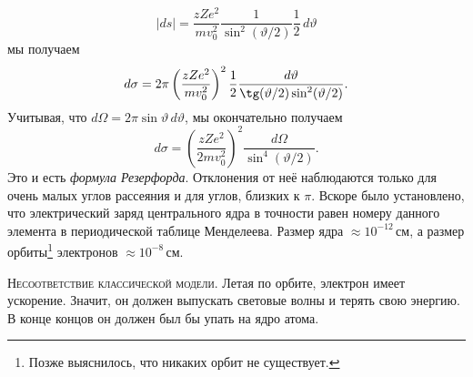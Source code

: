 \[
    |ds| = \frac{zZe^2}{mv_0^2}
    \frac{1}{\sin^2(\vartheta/2)}\frac{1}{2}\,d\vartheta
\]
мы получаем 
\[
    d\sigma = 2\pi \left( \frac{zZe^2}{mv_0^2} \right)^2
    \frac{1}{2}\frac{d\vartheta}{\tg(\vartheta/2) \sin^2 (\vartheta/2)}.
\]
Учитывая, что $ d\Omega = 2\pi\sin\vartheta\,d\vartheta $, мы окончательно
получаем 
\[
    d\sigma = \left( \frac{zZe^2}{2mv_0^2} \right)^2
    \frac{d\Omega}{\sin^4(\vartheta/2)}.
\]
Это и есть \emph{формула Резерфорда}. Отклонения от неё наблюдаются только для
очень малых углов рассеяния и для углов, близких к $ \pi $. Вскоре было
установлено, что электрический заряд центрального ядра в точности равен
номеру данного элемента в периодической таблице Менделеева.
Размер ядра $ \approx 10^{-12} $\,см, а размер орбиты\footnote{Позже выяснилось,
что никаких орбит не существует.} электронов $ \approx 10^{-8} $\,см.

\textsc{Несоответствие классической модели.} Летая по орбите, электрон имеет
ускорение. Значит, он должен выпускать световые волны и терять свою энергию. В
конце концов он должен был бы упать на ядро атома.




